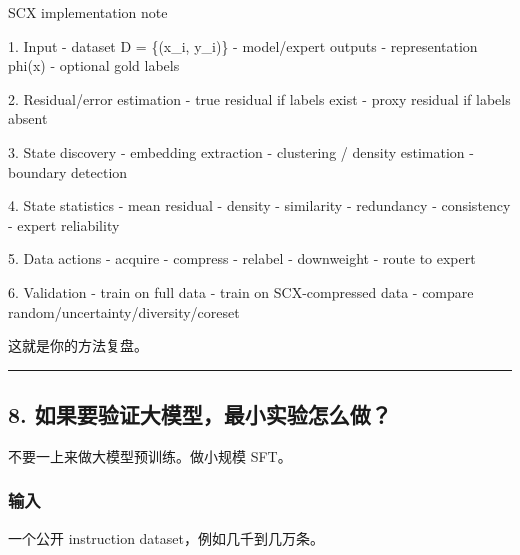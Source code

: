 \documentclass[
  12pt,
]{ctexart}
\newenvironment{Shaded}{}{}
\newcommand{\NormalTok}[1]{#1}
\begin{document}
\begin{Shaded}
\begin{Highlighting}[]
\NormalTok{SCX implementation note}

\NormalTok{1. Input}
\NormalTok{   {-} dataset D = \{(x\_i, y\_i)\}}
\NormalTok{   {-} model/expert outputs}
\NormalTok{   {-} representation phi(x)}
\NormalTok{   {-} optional gold labels}

\NormalTok{2. Residual/error estimation}
\NormalTok{   {-} true residual if labels exist}
\NormalTok{   {-} proxy residual if labels absent}

\NormalTok{3. State discovery}
\NormalTok{   {-} embedding extraction}
\NormalTok{   {-} clustering / density estimation}
\NormalTok{   {-} boundary detection}

\NormalTok{4. State statistics}
\NormalTok{   {-} mean residual}
\NormalTok{   {-} density}
\NormalTok{   {-} similarity}
\NormalTok{   {-} redundancy}
\NormalTok{   {-} consistency}
\NormalTok{   {-} expert reliability}

\NormalTok{5. Data actions}
\NormalTok{   {-} acquire}
\NormalTok{   {-} compress}
\NormalTok{   {-} relabel}
\NormalTok{   {-} downweight}
\NormalTok{   {-} route to expert}

\NormalTok{6. Validation}
\NormalTok{   {-} train on full data}
\NormalTok{   {-} train on SCX{-}compressed data}
\NormalTok{   {-} compare random/uncertainty/diversity/coreset}
\end{Highlighting}
\end{Shaded}

这就是你的方法复盘。

\begin{center}\rule{0.5\linewidth}{0.5pt}\end{center}

\subsection{8.
如果要验证大模型，最小实验怎么做？}\label{ux5982ux679cux8981ux9a8cux8bc1ux5927ux6a21ux578bux6700ux5c0fux5b9eux9a8cux600eux4e48ux505a}

不要一上来做大模型预训练。做小规模 SFT。

\subsubsection{输入}\label{ux8f93ux5165}

一个公开 instruction dataset，例如几千到几万条。
\end{document}
